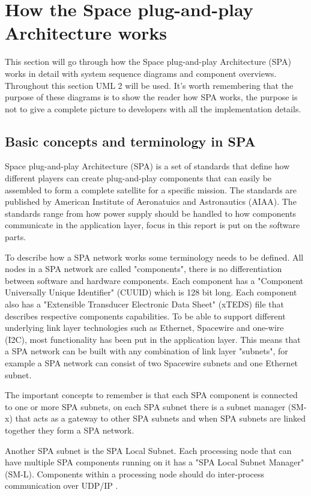 \chapter{How the Space plug-and-play Architecture works}\label{ch:spa}
This section will go through how the Space plug-and-play Architecture (SPA)
works in detail with system sequence diagrams and component overviews.
Throughout this section UML 2 will be used. It's worth remembering
that the purpose of these diagrams is to show the reader how SPA works, the
purpose is not to give a complete picture to developers with all the
implementation details.

\section{Basic concepts and terminology in SPA}
Space plug-and-play Architecture (SPA) is a set of standards that define how
different players can create plug-and-play components that can easily be
assembled to form a complete satellite for a specific mission. The standards
are published by American Institute of Aeronatuics and Astronautics (AIAA). The
standards range from how power supply should be handled to how components
communicate in the application layer, focus in this report is put on the
software parts.

To describe how a SPA network works some terminology needs to be defined. All
nodes in a SPA network are called "components", there is no differentiation
between software and hardware components. Each component has a "Component
Universally Unique Identifier" (CUUID) which is 128 bit long. Each component
also has a "Extensible Transducer Electronic Data Sheet" (xTEDS) file that
describes respective components capabilities. To be able to support different
underlying link layer technologies such as Ethernet, Spacewire and one-wire
(I2C), most functionality has been put in the application layer. This means
that a SPA network can be built with any combination of link layer "subnets",
for example a SPA network can consist of two Spacewire subnets and one Ethernet
subnet.

The important concepts to remember is that each SPA component is
connected to one or more SPA subnets, on each SPA subnet there is a subnet
manager (SM-x) that acts as a gateway to other SPA subnets and when SPA subnets
are linked together they form a SPA network.

Another SPA subnet is the SPA Local Subnet. Each processing node that can
have multiple SPA components running on it has a "SPA Local Subnet Manager"
(SM-L).  Components within a processing node should do inter-process
communication over UDP/IP \cite{spa:local-subnet}.

